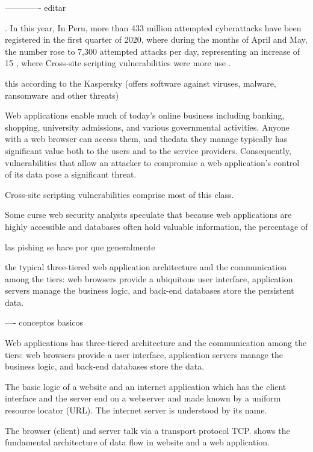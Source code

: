 \documentclass[12pt]{article}
\begin{document}
-------------
editar

. In this year, 
In Peru, more than 433 million attempted cyberattacks have been registered in the first quarter of 2020, where during the months of April and May, the number rose to 7,300 attempted attacks per day, representing an increase of 15%
, where  Cross-site scripting   vulnerabilities were more use .

this  according to the 
Kaspersky (offers software against viruses, malware, ransomware and other threats)


Web applications enable much of today’s online business including
banking, shopping, university admissions, and various governmental activities. Anyone with a web browser can access them, and thedata they manage typically has significant value both to the users and to the service providers. Consequently, vulnerabilities that allow an attacker to compromise a web application’s control of its data pose a significant threat.

Cross-site scripting  vulnerabilities 
 comprise most of this class. 



 Some curse
web security analysts speculate that because web applications are
highly accessible and databases often hold valuable information,
the percentage of 



las pishing se hace por que generalmente

 the typical three-tiered web application architecture
and  the communication among the tiers: web browsers provide a ubiquitous user interface, application servers manage the
business logic, and back-end databases store the persistent data.




----
conceptos basicos 


Web applications has 
three-tiered  architecture
and  the communication among the tiers: web browsers provide a  user interface, application servers manage the
business logic, and back-end databases store the  data.

The basic  logic of a website and an internet application which has the client interface and the server end on a webserver and made known by a uniform
resource locator (URL). 
The internet server is understood by
its name. 


The browser (client) and server talk via a transport
protocol TCP.  shows the fundamental architecture of
data flow in website and a web application.
\end{document}
